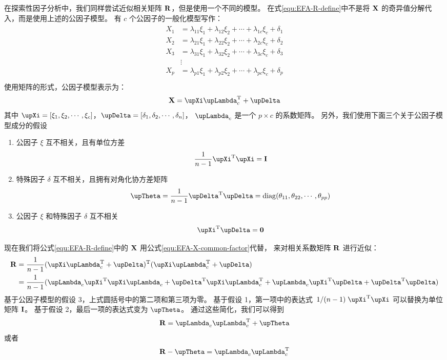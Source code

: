 在探索性因子分析中，我们同样尝试近似相关矩阵 $ \mathbf{R} $，但是使用一个不同的模型。
在式\eqref{equ:EFA-R-define}中不是将 $ \mathbf{X} $ 的奇异值分解代入，而是使用上述的公因子模型。
有 $ c $ 个公因子的一般化模型写作：
\begin{align}
    \begin{split}
        X_1 & = \lambda_{11}\xi_{1} + \lambda_{12}\xi_{2} + \cdots + \lambda_{1c}\xi_{c} + \delta_1 \\
        X_2 & = \lambda_{21}\xi_{1} + \lambda_{22}\xi_{2} + \cdots + \lambda_{2c}\xi_{c} + \delta_2 \\
        X_3 & = \lambda_{31}\xi_{1} + \lambda_{32}\xi_{2} + \cdots + \lambda_{3c}\xi_{c} + \delta_3 \\
        & \vdots \\
        X_p & = \lambda_{p1}\xi_{1} + \lambda_{p2}\xi_{2} + \cdots + \lambda_{pc}\xi_{c} + \delta_p \\
    \end{split}
\end{align}
使用矩阵的形式，公因子模型表示为：
\begin{eqnarray}\label{equ:EFA-X-common-factor}
    \vX = \vXi\vLambda_c\T + \vDelta
\end{eqnarray}
其中 $ \vXi = [\xi_1, \xi_2, \cdots, \xi_c] $，$ \vDelta = [\delta_1, \delta_2, \cdots, \delta_n] $，
$ \vLambda_c $ 是一个 $ p \times c $ 的系数矩阵。
另外，我们使用下面三个关于公因子模型成分的假设
\begin{enumerate}
    \item 公因子 $ \xi $ 互不相关，且有单位方差 $$ \frac{1}{n-1}\vXi\T\vXi = \vI $$
    \item 特殊因子 $ \delta $ 互不相关，且拥有对角化协方差矩阵
    $$ \vTheta = \frac{1}{n-1}\vDelta\T\vDelta = \diag(\theta_{11}, \theta_{22}, \cdots, \theta_{pp}) $$
    \item 公因子 $ \xi $ 和特殊因子 $ \delta $ 互不相关 $$ \vXi\T\vDelta = \vzero $$
\end{enumerate}

现在我们将公式\eqref{equ:EFA-R-define}中的 $ \mathbf{X} $ 用公式\eqref{equ:EFA-X-common-factor}代替，
来对相关系数矩阵 $ \mathbf{R} $ 进行近似：
\begin{align}
    \begin{split}
        \vR & = \frac{1}{n-1}(\vXi\vLambda_c\T + \vDelta)\T(\vXi\vLambda_c\T + \vDelta) \\ 
        & = \frac{1}{n-1}(
            \vLambda_c\vXi\T\vXi\vLambda_c +
            \vDelta\T\vXi\vLambda_c\T +
            \vLambda_c\vXi\T\vDelta +
            \vDelta\T\vDelta
        )
    \end{split}
\end{align}
基于公因子模型的假设 3，上式圆括号中的第二项和第三项为零。
基于假设 1，第一项中的表达式 $ \hfrac{1}{(n-1)}\vXi\T\vXi $ 可以替换为单位矩阵 $ \mathbf{I} $。
基于假设 2，最后一项的表达式变为 $ \vTheta $。
通过这些简化，我们可以得到
\begin{equation}
    \vR = \vLambda_c\vLambda_c\T + \vTheta
\end{equation}
或者
\begin{equation}\label{equ:EFA-R-efa}
    \vR - \vTheta = \vLambda_c\vLambda_c\T
\end{equation}

